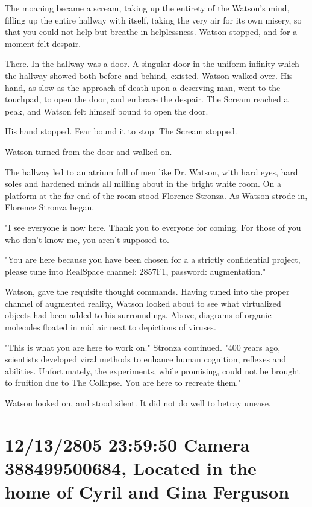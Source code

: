 \documentclass[12pt]{book}
\begin{document}
The moaning became a scream, taking up the entirety of the Watson's mind, filling up the entire hallway with itself, taking the very air for its own misery, so that you could not help but breathe in helplessness. Watson stopped, and for a moment felt despair.

There. In the hallway was a door. A singular door in the uniform infinity which the hallway showed both before and behind, existed. Watson walked over. His hand, as slow as the approach of death upon a deserving man, went to the touchpad, to open the door, and embrace the despair. The Scream reached a peak, and Watson felt himself bound to open the door. 

His hand stopped. Fear bound it to stop. The Scream stopped.

Watson turned from the door and walked on.

The hallway led to an atrium full of men like Dr. Watson, with hard eyes, hard soles and hardened minds all milling about in the bright white room. On a platform at the far end of the room stood Florence Stronza. As Watson strode in, Florence Stronza began.

"I see everyone is now here. Thank you to everyone for coming. For those of you who don't know me, you aren't supposed to.

"You are here because you have been chosen for a a strictly confidential project, please tune into RealSpace channel: 2857F1, password: augmentation."

Watson, gave the requisite thought commands. Having tuned into the proper channel of augmented reality, Watson looked about to see what virtualized objects had been added to his surroundings. Above, diagrams of organic molecules floated in mid air next to depictions of viruses.

"This is what you are here to work on." Stronza continued. "400 years ago, scientists developed viral methods to enhance human cognition, reflexes and abilities. Unfortunately, the experiments, while promising, could not be brought to fruition due to The Collapse. You are here to recreate them."

Watson looked on, and stood silent. It did not do well to betray unease.

\section*{12/13/2805 23:59:50 Camera 388499500684, Located in the home of Cyril and Gina Ferguson}
\label{sec:orgd5e577e}
\end{document}
